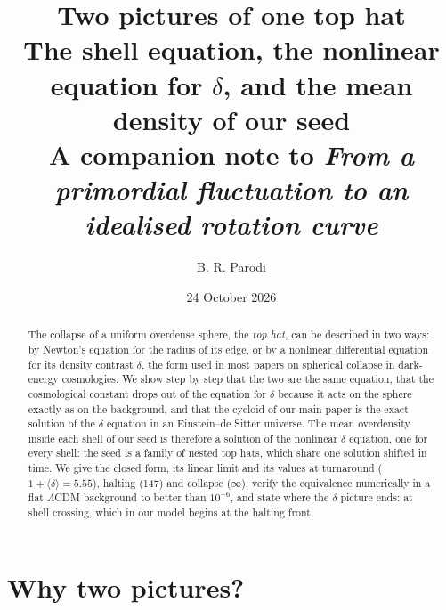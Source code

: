 \documentclass[11pt,a4paper]{article}
\title{Two pictures of one top hat\\[4pt]
\large The shell equation, the nonlinear equation for $\delta$, and the mean
density of our seed\\[2pt]
\normalsize A companion note to \emph{From a primordial fluctuation to an idealised rotation curve}}
\author{B. R. Parodi}
\date{24 October 2026}
\newcommand{\md}{\langle\delta\rangle}
\begin{document}
\maketitle

\begin{abstract}
The collapse of a uniform overdense sphere, the \emph{top hat}, can be
described in two ways: by Newton's equation for the radius of its edge,
or by a nonlinear differential equation for its density contrast
$\delta$, the form used in most papers on spherical collapse in
dark-energy cosmologies. We show step by step that the two are the same
equation, that the cosmological constant drops out of the equation for
$\delta$ because it acts on the sphere exactly as on the background, and
that the cycloid of our main paper is the exact solution of the
$\delta$ equation in an Einstein--de Sitter universe. The mean
overdensity inside each shell of our seed is therefore a solution of the
nonlinear $\delta$ equation, one for every shell: the seed is a family
of nested top hats, which share one solution shifted in time. We give
the closed form, its linear limit and its values at turnaround
($1+\md=5.55$), halting (147) and collapse ($\infty$), verify the
equivalence numerically in a flat $\Lambda$CDM background to better than
$10^{-6}$, and state where the $\delta$ picture ends: at shell crossing,
which in our model begins at the halting front.
\end{abstract}

\section{Why two pictures?}
\end{document}

